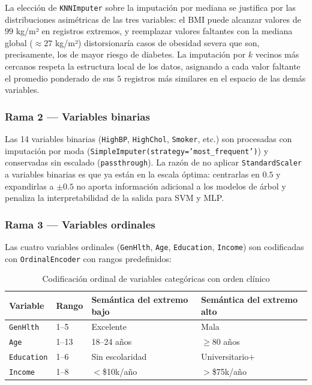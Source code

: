 \documentclass[12pt,a4paper]{article}
\begin{document}
La elección de \texttt{KNNImputer} sobre la imputación por mediana se justifica por las distribuciones asimétricas de las tres variables: el BMI puede alcanzar valores de $99$ kg/m² en registros extremos, y reemplazar valores faltantes con la mediana global ($\approx 27$ kg/m²) distorsionaría casos de obesidad severa que son, precisamente, los de mayor riesgo de diabetes. La imputación por $k$ vecinos más cercanos respeta la estructura local de los datos, asignando a cada valor faltante el promedio ponderado de sus $5$ registros más similares en el espacio de las demás variables.

\subsubsection{Rama 2 — Variables binarias}

Las 14 variables binarias (\texttt{HighBP}, \texttt{HighChol}, \texttt{Smoker}, etc.) son procesadas con imputación por moda (\texttt{SimpleImputer(strategy='most\_frequent')}) y conservadas sin escalado (\texttt{passthrough}). La razón de no aplicar \texttt{StandardScaler} a variables binarias es que ya están en la escala óptima: centrarlas en $0.5$ y expandirlas a $\pm 0.5$ no aporta información adicional a los modelos de árbol y penaliza la interpretabilidad de la salida para SVM y MLP.

\subsubsection{Rama 3 — Variables ordinales}

Las cuatro variables ordinales (\texttt{GenHlth}, \texttt{Age}, \texttt{Education}, \texttt{Income}) son codificadas con \texttt{OrdinalEncoder} con rangos predefinidos:

\begin{table}[H]
  \centering
  \caption{Codificación ordinal de variables categóricas con orden clínico}
  \begin{tabular}{llll}
    \toprule
    \textbf{Variable} & \textbf{Rango} & \textbf{Semántica del extremo bajo} & \textbf{Semántica del extremo alto}\\
    \midrule
    \texttt{GenHlth} & 1–5 & Excelente & Mala\\
    \texttt{Age} & 1–13 & 18–24 años & $\geq$80 años\\
    \texttt{Education} & 1–6 & Sin escolaridad & Universitario+\\
    \texttt{Income} & 1–8 & $<$\$10k/año & $>$\$75k/año\\
    \bottomrule
  \end{tabular}
\end{table}
\end{document}
